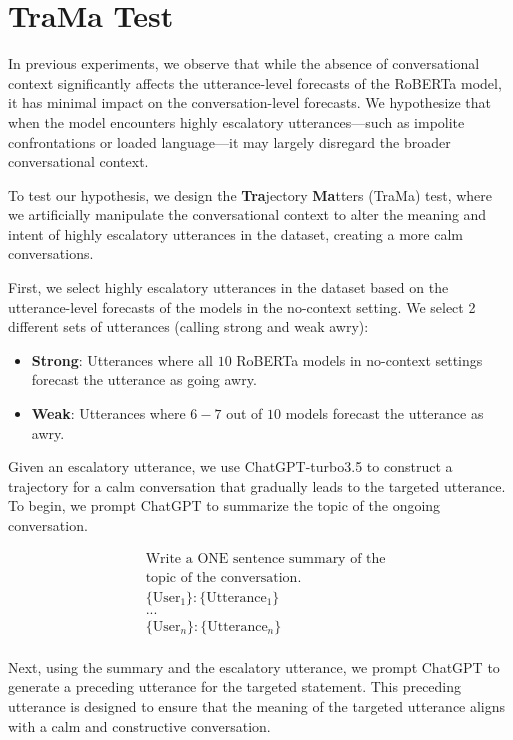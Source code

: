 \section{TraMa Test}
In previous experiments, we observe that while the absence of conversational context significantly affects the utterance-level forecasts of the RoBERTa model, it has minimal impact on the conversation-level forecasts. We hypothesize that when the model encounters highly escalatory utterances—such as impolite confrontations or loaded language—it may largely disregard the broader conversational context.

To test our hypothesis, we design the \textbf{Tra}jectory \textbf{Ma}tters (TraMa) test, where we artificially manipulate the conversational context to alter the meaning and intent of highly escalatory utterances in the dataset, creating a more calm conversations.

First, we select highly escalatory utterances in the dataset based on the utterance-level forecasts of the models in the no-context setting. We select 2 different sets of utterances (calling strong and weak awry):
\begin{itemize}
    \item \textbf{Strong}: Utterances where all $10$ RoBERTa models in no-context settings forecast the utterance as going awry.

    \item \textbf{Weak}: Utterances where $6-7$ out of $10$ models forecast the utterance as awry.
\end{itemize}

Given an escalatory utterance, we use ChatGPT-turbo3.5 to construct a trajectory for a calm conversation that gradually leads to the targeted utterance. To begin, we prompt ChatGPT to summarize the topic of the ongoing conversation.

{\ttfamily
\begin{align*}
& \text{Write a ONE sentence summary of the}\\
& \text{topic of the conversation.}\\
& \{\text{User}_1\} : \{\text{Utterance}_1\}\\
& ...\\
& \{\text{User}_n\} : \{\text{Utterance}_n\}\\
\end{align*}
}

Next, using the summary and the escalatory utterance, we prompt ChatGPT to generate a preceding utterance for the targeted statement. This preceding utterance is designed to ensure that the meaning of the targeted utterance aligns with a calm and constructive conversation.


